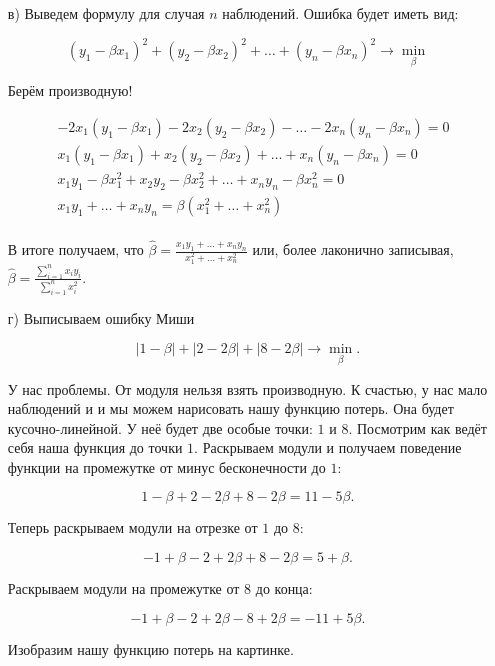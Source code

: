 \documentclass[12pt, a4paper, oneside]{article}
\begin{document}
{\begin{enumerate}
	
	\item[в)]  Выведем формулу для случая $n$ наблюдений. Ошибка будет иметь вид: 
	
	\[(y_1 - \beta x_1)^2 + (y_2 - \beta x_2)^2 + \ldots + (y_n - \beta x_n )^2 \to \min_{\beta} \]
	
	Берём производную! 
	
	\begin{equation*}
	\begin{aligned}
	&  -2 x_1 (y_1 - \beta x_1) - 2 x_2 (y_2 - \beta x_2) - \ldots -2 x_n (y_n - \beta x_n) = 0 \\
	& x_1 (y_1 - \beta x_1) +  x_2 (y_2 - \beta x_2) + \ldots +  x_n (y_n - \beta x_n) = 0  \\
	& x_1 y_1 - \beta x_1^2 + x_2 y_2 - \beta x_2^2 + \ldots + x_n y_n - \beta x_n^2 = 0\\
	& x_1 y_1 + \ldots + x_n y_n = \beta (x_1^2 + \ldots + x_n^2) \\
	\end{aligned}
	\end{equation*}
	
	В итоге получаем, что $\hat \beta = \frac{x_1 y_1 + \ldots + x_n y_n}{x_1^2 + \ldots + x_n^2}$ или, более лаконично записывая, $\hat \beta = \frac{\sum_{i=1}^{n} x_i y_i }{\sum_{i=1}^n x_i^2}.$
	
	\item[г)] Выписываем ошибку Миши
	
	\[ |1- \beta| + |2 - 2 \beta| + |8 - 2 \beta|  \to \min_{\beta}. \]
	
	У нас проблемы. От модуля нельзя взять производную. К счастью, у нас мало наблюдений и и мы можем нарисовать нашу функцию потерь. Она будет кусочно-линейной. У неё будет две особые точки: $1$ и $8$.  Посмотрим как ведёт себя наша функция до точки $1$. Раскрываем модули и получаем поведение функции на промежутке от минус бесконечности до $1$: 
	
	\[ 1 - \beta + 2 - 2\beta + 8 - 2\beta = 11 - 5\beta.\] 	
	
	Теперь раскрываем модули на отрезке от $1$ до $8$: 
	
	\[ - 1 + \beta - 2 + 2\beta + 8 - 2\beta = 5 + \beta.\] 
	
	Раскрываем модули на промежутке от $8$ до конца: 
	
	\[ - 1 + \beta - 2 + 2\beta  - 8 + 2\beta = -11 + 5 \beta. \]
	
	Изобразим нашу функцию потерь на картинке. 
	

\end{enumerate}}
\end{document}
